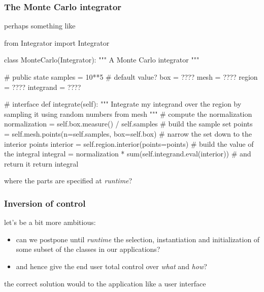 \begin{frame}[fragile]
%
  \frametitle{The Monte Carlo integrator}
%
  perhaps something like
%
  \begin{ipython}[basicstyle=\tt\tiny]{}
from Integrator import Integrator

class MonteCarlo(Integrator):
    """
    A Monte Carlo integrator
    """

    # public state
    samples = 10**5 # default value?
    box = ????
    mesh = ????
    region = ????
    integrand = ????

    # interface
    def integrate(self):
        """
        Integrate my {integrand} over the {region} by sampling it using random
        numbers from {mesh}
        """
        # compute the normalization
        normalization = self.box.measure() / self.samples
        # build the sample set
        points = self.mesh.points(n=self.samples, box=self.box)
        # narrow the set down to the interior points
        interior = self.region.interior(points=points)
        # build the value of the integral
        integral = normalization * sum(self.integrand.eval(interior))
        # and return it
        return integral
  \end{ipython}
%
  where the parts are specified at \emph{runtime}?
%
\end{frame}

\begin{frame}[fragile]
%
  \frametitle{Inversion of control}
%
  let's be a bit more ambitious: 
  \begin{itemize}
  \item can we postpone until \emph{runtime} the selection, instantiation and initialization of
    some subset of the classes in our applications?
  \item and hence give the end user total control over \emph{what} and \emph{how}?
  \end{itemize}

  the correct solution would to the application like a user interface
%
\end{frame}

